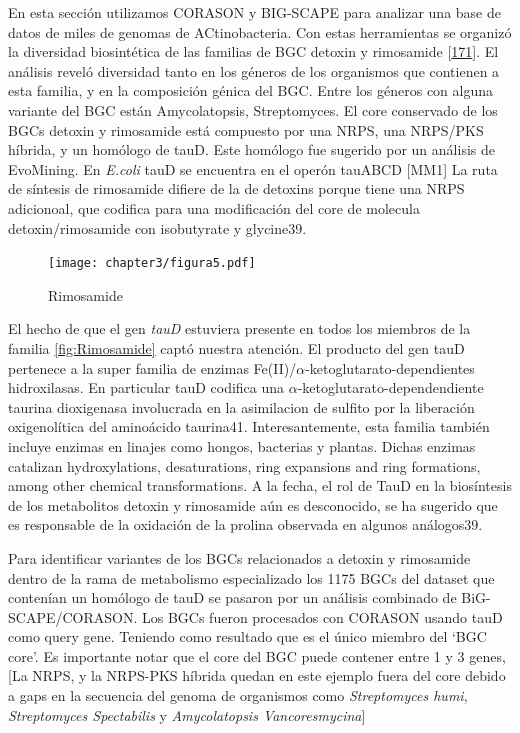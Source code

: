 \documentclass[12pt,twoside]{reedthesis}
\begin{document}
  En esta sección utilizamos CORASON y BIG-SCAPE para analizar una base de
  datos de miles de genomas de ACtinobacteria. Con estas herramientas se
  organizó la diversidad biosintética de las familias de BGC detoxin y
  rimosamide {[}\protect\hyperlink{ref-mcclure_elucidating_2016}{171}{]}.
  El análisis reveló diversidad tanto en los géneros de los organismos que
  contienen a esta familia, y en la composición génica del BGC. Entre los
  géneros con alguna variante del BGC están Amycolatopsis, Streptomyces.
  El core conservado de los BGCs detoxin y rimosamide está compuesto por
  una NRPS, una NRPS/PKS híbrida, y un homólogo de tauD. Este homólogo fue
  sugerido por un análisis de EvoMining. En \emph{E.coli} tauD se
  encuentra en el operón tauABCD {[}MM1{]} La ruta de síntesis de
  rimosamide difiere de la de detoxins porque tiene una NRPS adicionoal,
  que codifica para una modificación del core de molecula
  detoxin/rimosamide con isobutyrate y glycine39.
  
  \begin{figure}[h!tbp]
  \centering
  \texttt{[image: chapter3/figura5.pdf]}
  \caption[Rimosamide]{\footnotesize{Rimosamide}}
  \label{fig:Rimosamide}
  \end{figure}
  
  El hecho de que el gen \emph{tauD} estuviera presente en todos los
  miembros de la familia \autoref{fig:Rimosamide} captó nuestra atención.
  El producto del gen tauD pertenece a la super familia de enzimas
  Fe(II)/\(\alpha\)-ketoglutarato-dependientes hidroxilasas. En particular
  tauD codifica una \(\alpha\)-ketoglutarato-dependendiente taurina
  dioxigenasa involucrada en la asimilacion de sulfito por la liberación
  oxigenolítica del aminoácido taurina41. Interesantemente, esta familia
  también incluye enzimas en linajes como hongos, bacterias y plantas.
  Dichas enzimas catalizan hydroxylations, desaturations, ring expansions
  and ring formations, among other chemical transformations. A la fecha,
  el rol de TauD en la biosíntesis de los metabolitos detoxin y rimosamide
  aún es desconocido, se ha sugerido que es responsable de la oxidación de
  la prolina observada en algunos análogos39.
  
  Para identificar variantes de los BGCs relacionados a detoxin y
  rimosamide dentro de la rama de metabolismo especializado los 1175 BGCs
  del dataset que contenían un homólogo de tauD se pasaron por un análisis
  combinado de BiG-SCAPE/CORASON. Los BGCs fueron procesados con CORASON
  usando tauD como query gene. Teniendo como resultado que es el único
  miembro del `BGC core'. Es importante notar que el core del BGC puede
  contener entre 1 y 3 genes, {[}La NRPS, y la NRPS-PKS híbrida quedan en
  este ejemplo fuera del core debido a gaps en la secuencia del genoma de
  organismos como \emph{Streptomyces humi}, \emph{Streptomyces
  Spectabilis} y \emph{Amycolatopsis Vancoresmycina}{]}
  
\end{document}
